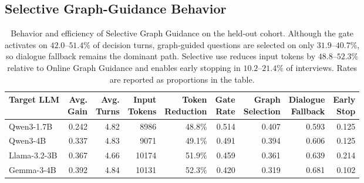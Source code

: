 \documentclass{ieeeaccess}
\begin{document}
\subsection{Selective Graph-Guidance Behavior}
\renewcommand{\thetable}{S10}
\begin{table}[H]
\centering
\caption{Behavior and efficiency of Selective Graph Guidance on the held-out cohort. Although
the gate activates on $42.0$--$51.4\%$ of decision turns, graph-guided questions are selected
on only $31.9$--$40.7\%$, so dialogue fallback remains the dominant path. Selective use
reduces input tokens by $48.8$--$52.3\%$ relative to Online Graph Guidance and enables early
stopping in $10.2$--$21.4\%$ of interviews. Rates are reported as proportions in the table.}
\label{tab:selective_behavior}
\footnotesize
\setlength{\tabcolsep}{3pt}
\begin{tabular*}{\textwidth}{@{\extracolsep{\fill}}lrrrrrrrr@{}}
\toprule
\textbf{Target LLM}
& \makecell{\textbf{Avg.}\\\textbf{Gain}}
& \makecell{\textbf{Avg.}\\\textbf{Turns}}
& \makecell{\textbf{Input}\\\textbf{Tokens}}
& \makecell{\textbf{Token}\\\textbf{Reduction}}
& \makecell{\textbf{Gate}\\\textbf{Rate}}
& \makecell{\textbf{Graph}\\\textbf{Selection}}
& \makecell{\textbf{Dialogue}\\\textbf{Fallback}}
& \makecell{\textbf{Early}\\\textbf{Stop}} \\
\midrule
Qwen3-1.7B   & 0.242 & 4.82 & 8986  & 48.8\% & 0.514 & 0.407 & 0.593 & 0.125 \\
Qwen3-4B     & 0.337 & 4.83 & 9071  & 49.1\% & 0.491 & 0.394 & 0.606 & 0.125 \\
Llama-3.2-3B & 0.367 & 4.66 & 10174 & 51.9\% & 0.459 & 0.361 & 0.639 & 0.214 \\
Gemma-3-4B   & 0.392 & 4.84 & 10131 & 52.3\% & 0.420 & 0.319 & 0.681 & 0.102 \\
\bottomrule
\end{tabular*}
\end{table}
\end{document}
